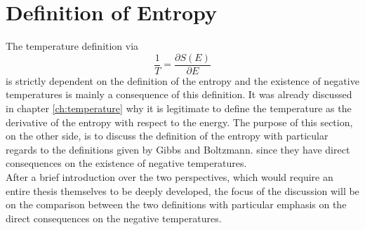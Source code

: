 \chapter{Definition of Entropy}
\label{ch:entropy}
The temperature definition via
\begin{equation*}
    \frac{1}{T} = \frac{\partial S(E)}{\partial E}
\end{equation*}
is strictly dependent on the definition of the entropy and the existence of negative temperatures is mainly a consequence of this definition. 
It was already discussed in chapter \ref{ch:temperature} why it is legitimate to define the temperature as the derivative of the entropy with respect to the energy. The purpose of this section, on the other side,
is to discuss the definition of the entropy with particular regards to the definitions given by Gibbs and Boltzmann. since they have direct consequences on the existence of negative temperatures. \\
After a brief introduction over the two perspectives, which would require an entire thesis themselves to be deeply developed, the focus of the discussion will be on the comparison between the two definitions with particular emphasis on the direct consequences on the negative temperatures.

